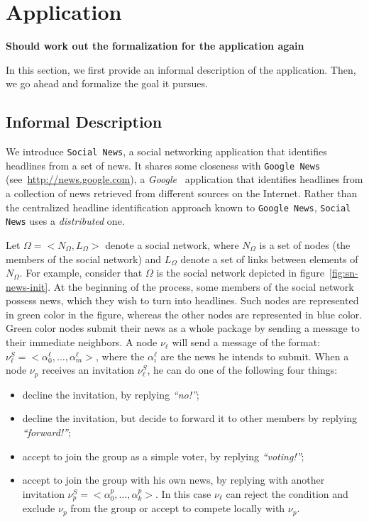 \section{Application} %
\label{sec:application}

\textbf{Should work out the formalization for the application again}

In this section, we first provide an informal description of the application. Then, we go ahead and formalize the goal it
pursues.

\subsection{Informal Description} %
\label{sub:informal_description}

We introduce {\tt Social News}, a social networking application that identifies headlines from a set of news. It shares
some closeness with {\tt Google News} (see~\url{http://news.google.com}), a \emph{Google~\texttrademark} application that
identifies headlines from a collection of news retrieved from different sources on the Internet. Rather than the
centralized headline identification approach known to {\tt Google News}, {\tt Social News} uses a \emph{distributed} one.

Let $\Omega=<N_\Omega,L_\Omega>$ denote a social network, where $N_\Omega$ is a set of nodes (the members of the social
network) and $L_\Omega$ denote a set of links between elements of $N_\Omega$. For example, consider that $\Omega$ is the
social network depicted in figure~\ref{fig:sn-news-init}. At the beginning of the process, some members of the social
network possess news, which they wish to turn into headlines. Such nodes are represented in green color in the figure,
whereas the other nodes are represented in blue color. Green color nodes submit their news as a whole package by sending
a message to their immediate neighbors. A node $\nu_\ell$ will send a message of the format:
$\nu_\ell^S=<\alpha_0^\ell,\ldots,\alpha_m^\ell>$, where the $\alpha_\imath^\ell$ are the news he intends to submit. When
a node $\nu_p$ receives an invitation $\nu_\ell^S$, he can do one of the following four things:

\begin{itemize} 
	\item decline the invitation, by replying \emph{``no!''};
	\item decline the invitation, but decide to forward it to other members by replying \emph{``forward!''};
	\item accept to join the group as a simple voter, by replying \emph{``voting!''}; 
	\item accept to join the group with his own news, by replying with another invitation $\nu_p^S=<\alpha_0^p,\ldots,\alpha_k^p>$. In this case $\nu_\ell$ can reject the condition and exclude $\nu_p$
from the group or accept to compete locally with $\nu_p$. 
\end{itemize}

